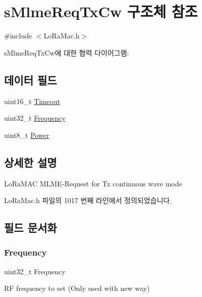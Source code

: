 \hypertarget{structs_mlme_req_tx_cw}{}\section{s\+Mlme\+Req\+Tx\+Cw 구조체 참조}
\label{structs_mlme_req_tx_cw}


{\ttfamily \#include $<$Lo\+Ra\+Mac.\+h$>$}



s\+Mlme\+Req\+Tx\+Cw에 대한 협력 다이어그램\+:
\subsection*{데이터 필드}
\begin{DoxyCompactItemize}
\item 
uint16\+\_\+t \mbox{\hyperlink{structs_mlme_req_tx_cw_ae1c58f120c7eef7bb71a5e3bfeaeb795}{Timeout}}
\item 
uint32\+\_\+t \mbox{\hyperlink{structs_mlme_req_tx_cw_ade3d190636488dad9a89b19446b7acf1}{Frequency}}
\item 
uint8\+\_\+t \mbox{\hyperlink{structs_mlme_req_tx_cw_ab44615b5dd16068c5a1bfb228b72c081}{Power}}
\end{DoxyCompactItemize}


\subsection{상세한 설명}
Lo\+Ra\+M\+AC M\+L\+M\+E-\/\+Request for Tx continuous wave mode 

Lo\+Ra\+Mac.\+h 파일의 1017 번째 라인에서 정의되었습니다.



\subsection{필드 문서화}
\mbox{\label{structs_mlme_req_tx_cw_ade3d190636488dad9a89b19446b7acf1}} 
\subsubsection{\texorpdfstring{Frequency}{Frequency}}
{\footnotesize\ttfamily uint32\+\_\+t Frequency}

RF frequency to set (Only used with new way) 

